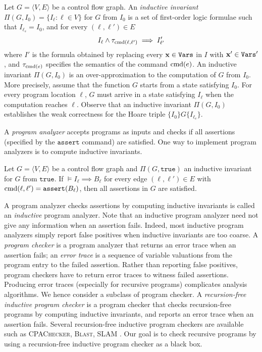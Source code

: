 Let $G = \langle V, E \rangle$ be a control flow graph.
An \emph{inductive invariant} $\Pi (G, I_0) = \{ I_\ell : \ell \in V
\}$ for $G$ from $I_0$ is a set of first-order logic formulae such
that $I_{\ell_s} = I_0$, and for every $(\ell, \ell') \in E$
\begin{equation*}
I_{\ell} \wedge \tau_{\textmd{cmd}(\ell, \ell')} \implies I'_{\ell'}
\end{equation*}
where $I'$ is the formula obtained by replacing every $\textbf{x} \in
\mathtt{Vars}$ in $I$ with $\textbf{x}' \in \mathtt{Vars}'$, and
$\tau_{\textmd{cmd} (e)}$ specifies the semantics of the command
$\textmd{cmd} (e)$. An inductive invariant $\Pi (G, I_0)$ is an
over-approximation to the computation of $G$ from $I_0$. More
precisely, assume that the function $G$ starts from a state satisfying
$I_0$. For every program location $\ell$, $G$ must arrive in a state
satisfying $I_{\ell}$ when the computation reaches $\ell$. Observe
that an inductive invariant $\Pi (G, I_0)$ establishes the weak
correctness for the Hoare triple $\{ I_0 \} G \{ I_{\ell_e} \}$.

A \emph{program analyzer} accepts programs as inputs and
checks if all assertions (specified by the $\mathtt{assert}$ command)
are satisfied. One way to implement program analyzers is to compute
inductive invariants. 
\begin{proposition}
Let $G = \langle V, E \rangle$ be a control flow
graph and $\Pi (G, \mathtt{true})$ an inductive invariant for $G$ from
$\mathtt{true}$. If $\models I_{\ell} \implies B_{\ell}$ for every
edge $(\ell, \ell') \in E$ with $\textmd{cmd} (\ell, \ell') =
\mathtt{assert} (B_{\ell})$, then all assertions in $G$ are satisfied.
\end{proposition}
A program analyzer checks assertions by computing inductive invariants
is called an \emph{inductive} program analyzer. Note that an inductive
program analyzer need not give any information when an assertion fails. 
Indeed, most inductive program analyzers simply report false positives
when inductive invariants are too coarse. A \emph{program checker} is
a program analyzer that returns an error trace when an assertion
fails; an \emph{error trace} is a sequence of variable valuations from
the program entry to the failed assertion. Rather than reporting false
positives, program checkers have to return error traces to witness 
failed assertions. Producing error traces (especially for recursive
programs) complicates analysis algorithms. We hence consider a
subclass of program checker. A \emph{recursion-free
  inductive program checker} is a program checker that checks
recursion-free programs by computing inductive invariants, and reports
an error trace when an assertion fails. Several recursion-free
inductive program checkers are available such as \textsc{CPAChecker},
\textsc{Blast}, \textsc{SLAM} . Our goal is to check
recursive programs by using a recursion-free inductive program checker
as a black box. 
